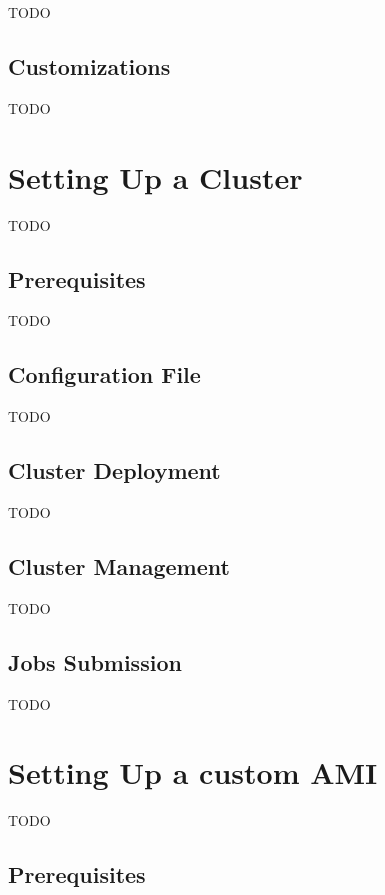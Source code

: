 TODO

\subsection{Customizations}
\label{ssec:customizations}

TODO

\section{Setting Up a Cluster}
\label{sec:setting-up-a-cluster}

TODO

\subsection{Prerequisites}
\label{ssec:setting-up-a-cluster-prerequisites}

TODO

\subsection{Configuration File}
\label{ssec:setting-up-a-cluster-configuration-file}

TODO

\subsection{Cluster Deployment}
\label{ssec:cluster-deployment}

TODO

\subsection{Cluster Management}
\label{ssec:cluster-management}

TODO

\subsection{Jobs Submission}
\label{ssec:jobs-submission}

TODO

\section{Setting Up a custom AMI}
\label{sec:setting-up-a-custom-ami}

TODO

\subsection{Prerequisites}
\label{ssec:setting-up-a-custom-ami-prerequisites}

